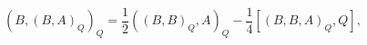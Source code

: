 \begin{equation}
\left(  B,(B,A)_{Q}\right)  _{Q}=\frac{1}{2}\left(  (B,B)_{Q},A\right)
_{Q}-\frac{1}{4}\left[  (B,B,A)_{Q},Q\right]  ,\label{1.8}%
\end{equation}%
